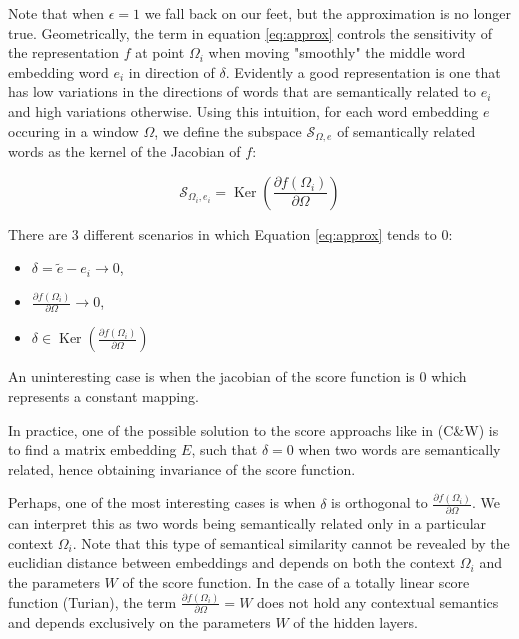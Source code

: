 \documentclass[11pt]{article} %
\begin{document}
Note that when $\epsilon = 1$ we fall back on our feet, but the
approximation is no longer true.  Geometrically, the term in equation
\ref{eq:approx} controls the sensitivity of the representation $f$ at
point $\Omega_i$ when moving "smoothly" the middle word embedding word
$e_{i}$ in direction of $\delta$. Evidently a good representation is
one that has low variations in the directions of words that are
semantically related to $e_{i}$ and high variations otherwise. Using
this intuition, for each word embedding $e$ occuring in a window
$\Omega$, we define the subspace $\mathcal{S}_{\Omega,e}$ of
semantically related words as the kernel of the Jacobian of $f$:

\begin{equation}
\mathcal{S}_{\Omega_i,e_{i}} = \operatorname{Ker}\left( \frac{\partial
  f(\Omega_i) }{\partial \Omega} \right)
\end{equation}



There are 3 different scenarios in which Equation \ref{eq:approx}
tends to $0$:
\begin{itemize}
\item $\delta = \tilde{e} - e_{i} \longrightarrow 0$,
\item  $\frac{\partial f(\Omega_i) }{\partial  \Omega}\longrightarrow  0$,
\item $\delta \in \operatorname{Ker} \left( \frac{\partial f(\Omega_i) }{\partial  \Omega} \right)$

\end{itemize}
An uninteresting case is when the jacobian of the score function is
$0$ which represents a constant mapping.

In practice, one of the possible solution to the score approachs like
in (C\&W) is to find a matrix embedding $E$, such that $\delta = 0$
when two words are semantically related, hence obtaining invariance of
the score function.

Perhaps, one of the most interesting cases is when $\delta$ is
orthogonal to $\frac{\partial f(\Omega_i) }{\partial \Omega}$. We can
interpret this as two words being semantically related only in a
particular context $\Omega_i$. Note that this type of semantical
similarity cannot be revealed by the euclidian distance between
embeddings and depends on both the context $\Omega_i$ and the
parameters $W$ of the score function. In the case of a totally linear
score function (Turian), the term $\frac{\partial f(\Omega_i)
}{\partial \Omega} = W$ does not hold any contextual semantics and
depends exclusively on the parameters $W$ of the hidden layers.
\end{document}
